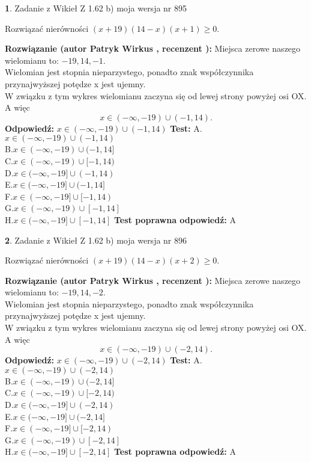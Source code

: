 \documentclass[12pt, a4paper]{article}
\theoremstyle{definition} %
\newtheorem{zad}{}
\newcommand{\zadStart}[1]{\begin{zad}#1\newline}
\newcommand{\zadStop}{\end{zad}}
\newcommand{\rozwStart}[2]{\noindent \textbf{Rozwiązanie (autor #1 , recenzent #2): }\newline}
\newcommand{\rozwStop}{\newline}
\newcommand{\odpStart}{\noindent \textbf{Odpowiedź:}\newline}
\newcommand{\odpStop}{\newline}
\newcommand{\testStart}{\noindent \textbf{Test:}\newline}
\newcommand{\testStop}{\newline}
\newcommand{\kluczStart}{\noindent \textbf{Test poprawna odpowiedź:}\newline}
\newcommand{\kluczStop}{\newline}
\begin{document}
\zadStart{Zadanie z Wikieł Z 1.62 b) moja wersja nr 895}

Rozwiązać nierówności $(x+19)(14-x)(x+1)\ge0$.
\zadStop
\rozwStart{Patryk Wirkus}{}
Miejsca zerowe naszego wielomianu to: $-19, 14, -1$.\\
Wielomian jest stopnia nieparzystego, ponadto znak współczynnika przy\linebreak najwyższej potędze x jest ujemny.\\ W związku z tym wykres wielomianu zaczyna się od lewej strony powyżej osi OX. A więc $$x \in (-\infty,-19) \cup (-1,14).$$
\rozwStop
\odpStart
$x \in (-\infty,-19) \cup (-1,14)$
\odpStop
\testStart
A.$x \in (-\infty,-19) \cup (-1,14)$\\
B.$x \in (-\infty,-19) \cup (-1,14]$\\
C.$x \in (-\infty,-19) \cup [-1,14)$\\
D.$x \in (-\infty,-19] \cup (-1,14)$\\
E.$x \in (-\infty,-19] \cup (-1,14]$\\
F.$x \in (-\infty,-19] \cup [-1,14)$\\
G.$x \in (-\infty,-19) \cup [-1,14]$\\
H.$x \in (-\infty,-19] \cup [-1,14]$
\testStop
\kluczStart
A
\kluczStop



\zadStart{Zadanie z Wikieł Z 1.62 b) moja wersja nr 896}

Rozwiązać nierówności $(x+19)(14-x)(x+2)\ge0$.
\zadStop
\rozwStart{Patryk Wirkus}{}
Miejsca zerowe naszego wielomianu to: $-19, 14, -2$.\\
Wielomian jest stopnia nieparzystego, ponadto znak współczynnika przy\linebreak najwyższej potędze x jest ujemny.\\ W związku z tym wykres wielomianu zaczyna się od lewej strony powyżej osi OX. A więc $$x \in (-\infty,-19) \cup (-2,14).$$
\rozwStop
\odpStart
$x \in (-\infty,-19) \cup (-2,14)$
\odpStop
\testStart
A.$x \in (-\infty,-19) \cup (-2,14)$\\
B.$x \in (-\infty,-19) \cup (-2,14]$\\
C.$x \in (-\infty,-19) \cup [-2,14)$\\
D.$x \in (-\infty,-19] \cup (-2,14)$\\
E.$x \in (-\infty,-19] \cup (-2,14]$\\
F.$x \in (-\infty,-19] \cup [-2,14)$\\
G.$x \in (-\infty,-19) \cup [-2,14]$\\
H.$x \in (-\infty,-19] \cup [-2,14]$
\testStop
\kluczStart
A
\kluczStop
\end{document}
